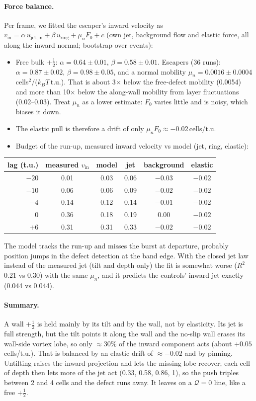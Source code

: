 \documentclass[aps,prl,onecolumn,superscriptaddress,amsmath,amssymb,nofootinbib]{revtex4-2}
\newcommand{\half}{\tfrac12}
\newcommand{\kT}{k_BT}
\begin{document}
\paragraph{Force balance.} Per frame, we fitted the escaper's inward velocity as $v_\mathrm{in}=\alpha\,u_\mathrm{jet,in}+\beta\,u_\mathrm{ring}+\mu_n F_0+c$
(own jet, background flow and elastic force, all along the inward normal; bootstrap over events):
\begin{itemize}
  \item Free bulk $+\half$: $\alpha=0.64\pm0.01$, $\beta=0.58\pm0.01$. Escapers (36 runs): $\alpha=0.87\pm0.02$, $\beta=0.98\pm0.05$, and a normal mobility $\mu_n=0.0016\pm0.0004$\,cells$^2$/($\kT$\,t.u.).
        That is about 3$\times$ below the free-defect mobility (0.0054) and more than 10$\times$ below the along-wall mobility from layer fluctuations (0.02--0.03). Treat $\mu_n$ as a lower estimate:
        $F_0$ varies little and is noisy, which biases it down.
  \item The elastic pull is therefore a drift of only $\mu_nF_0\approx-0.02$\,cells/t.u.
  \item Budget of the run-up, measured inward velocity vs model (jet, ring, elastic):
\end{itemize}
\begin{table}[h]\centering\small
\begin{tabular}{rccccc}\hline
lag (t.u.) & measured $v_\mathrm{in}$ & model & jet & background & elastic \\ \hline
$-20$ & 0.01 & 0.03 & 0.06 & $-0.03$ & $-0.02$ \\
$-10$ & 0.06 & 0.06 & 0.09 & $-0.02$ & $-0.02$ \\
$-4$  & 0.14 & 0.12 & 0.14 & $-0.01$ & $-0.02$ \\
0     & 0.36 & 0.18 & 0.19 & 0.00 & $-0.02$ \\
$+6$  & 0.31 & 0.31 & 0.33 & $-0.02$ & $-0.02$ \\ \hline
\end{tabular}
\end{table}
\noindent The model tracks the run-up and misses the burst at departure, probably position jumps in the defect detection at the band edge. With the closed jet law instead of the measured jet
(tilt and depth only) the fit is somewhat worse ($R^2$ 0.21 vs 0.30) with the same $\mu_n$, and it predicts the controls' inward jet exactly (0.044 vs 0.044).

\paragraph{Summary.} A wall $+\half$ is held mainly by its tilt and by the wall, not by elasticity. Its jet is full strength, but the tilt points it along the wall and the
no-slip wall erases its wall-side vortex lobe, so only $\approx30\%$ of the inward component acts (about $+0.05$\,cells/t.u.). That is balanced by an elastic drift of
$\approx-0.02$ and by pinning. Untilting raises the inward projection and lets the missing lobe recover; each cell of depth then lets more of the jet act (0.33, 0.58, 0.86, 1), so the push
triples between 2 and 4 cells and the defect runs away. It leaves on a $\mathcal Q=0$ line, like a free $+\half$.
\end{document}
